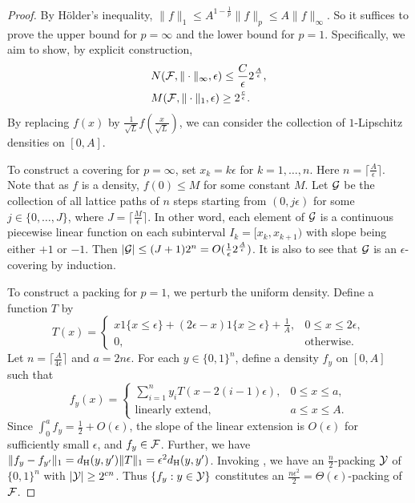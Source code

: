 \begin{proof}
    By H\"{o}lder's inequality, $\|f\|_1\leq A^{1-\frac{1}{p}}\|f\|_p\leq A\|f\|_\infty$.
    So it suffices to prove the upper bound for $p=\infty$ and the lower bound for $p=1$.
    Specifically, we aim to show, by explicit construction,
    \begin{align*}
        &N(\mathcal{F},\|\cdot\|_\infty,\epsilon)\leq \frac{C}{\epsilon}2^{\frac{A}{\epsilon}},\\
        &M(\mathcal{F},\|\cdot\|_1,\epsilon)\geq 2^{\frac{c}{\epsilon}}.
    \end{align*}
    By replacing $f(x)$ by $\frac{1}{\sqrt{L}}f(\frac{x}{\sqrt{L}})$, we can consider the collection of $1$-Lipschitz densities on $[0,A]$.

    To construct a covering for $p=\infty$, set $x_k=k\epsilon$ for $k=1,\dots,n$. Here $n=\lceil\frac{A}{\epsilon}\rceil$.
    Note that as $f$ is a density, $f(0)\leq M$ for some constant $M$.
    Let $\mathcal{G}$ be the collection of all lattice paths of $n$ steps starting from $(0,j\epsilon)$ for some $j\in\{0,\dots,J\}$, where $J=\lceil \frac{M}{\epsilon} \rceil$.
    In other word, each element of $\mathcal{G}$ is a continuous piecewise linear function on each subinterval $I_k=[x_k,x_{k+1})$ with slope being either $+1$ or $-1$.
    Then $|\mathcal{G}|\leq (J+1)2^n=O(\frac{1}{\epsilon}2^{\frac{A}{\epsilon}})$.
    It is also to see that $\mathcal{G}$ is an $\epsilon$-covering by induction.

    To construct a packing for $p=1$, we perturb the uniform density.
    Define a function $T$ by 
    \[T(x)=\begin{cases}
        x1\{x\leq\epsilon\}+(2\epsilon-x)1\{x\geq\epsilon\}+\frac{1}{A}, &0\leq x\leq 2\epsilon, \\
        0, & \text{otherwise}.
    \end{cases}\]
    Let $n=\lceil\frac{A}{4\epsilon}\rceil$ and $a=2n\epsilon$. 
    For each $y\in\{0,1\}^n$, define a density $f_y$ on $[0,A]$ such that 
    \[f_y(x)=\begin{cases}
        \sum_{i=1}^{n}y_i T(x-2(i-1)\epsilon), &0\leq x\leq a,\\
        \text{linearly extend}, &a\leq x\leq A.
    \end{cases}\]
    Since $\int_0^a f_y=\frac{1}{2}+O(\epsilon)$, the slope of the linear extension is $O(\epsilon)$ for sufficiently small $\epsilon$, and $f_y\in \mathcal{F}$.
    Further, we have $\|f_y-f_{y'}\|_1=d_{\rm H}(y,y')\|T\|_1=\epsilon^2d_{\rm H}(y,y')$.
    Invoking , we have an $\frac{n}{2}$-packing $\mathcal{Y}$ of $\{0,1\}^n$ with $|\mathcal{Y}|\geq 2^{cn}$.
    Thus $\{f_y:y\in\mathcal{Y}\}$ constitutes an $\frac{n\epsilon^2}{2}=\Theta(\epsilon)$-packing of $\mathcal{F}$.

\end{proof}


